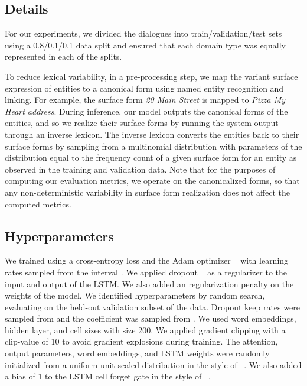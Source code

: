 \documentclass[11pt,a4paper]{article}
\begin{document}
\subsection{Details}
For our experiments, we divided the dialogues into train/validation/test sets using a 0.8/0.1/0.1 data split and ensured that each domain type was equally represented in each of the splits. 

To reduce lexical variability, in a pre-processing step, we map the variant surface expression of entities to a canonical form using named entity recognition and linking. For example, the surface form \emph{20 Main Street} is mapped to \emph{Pizza My Heart address}. During inference, our model outputs the canonical forms of the entities, and so we realize their surface forms by running the system output through an inverse lexicon. The inverse lexicon converts the entities back to their surface forms by sampling from a multinomial distribution with parameters of the distribution equal to the frequency count of a given surface form for an entity as observed in the training and validation data. Note that for the purposes of computing our evaluation metrics, we operate on the canonicalized forms, so that any non-deterministic variability in surface form realization does not affect the computed metrics.


\subsection{Hyperparameters}

We trained using a cross-entropy loss and the Adam optimizer ~\cite{Kingma:15} with learning rates sampled from the interval . We applied dropout ~\cite{Hinton:12} as a regularizer to the input and output of the LSTM. We also added an  regularization penalty on the weights of the model. We identified hyperparameters by random search, evaluating on the held-out validation subset of the data. Dropout keep rates were sampled from  and the  coefficient was sampled from . We used word embeddings, hidden layer, and cell sizes with size 200.  We applied gradient clipping with a clip-value of 10 to avoid gradient explosions during training.
The attention, output parameters, word embeddings, and LSTM weights were randomly initialized from a uniform unit-scaled distribution in the style of ~\cite{Sussillo:15}. We also added a bias of 1 to the LSTM cell forget gate in the style of ~\cite{Pham:14}. 
\end{document}
